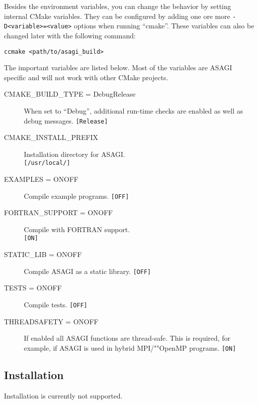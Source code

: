 Besides the environment variables, you can change the behavior by setting internal CMake variables. They can be configured by adding one ore more \texttt{-D<variable>=<value>} options when running ``cmake''. These variables can also be changed later with the following command:
\lstset{language=bash}
\begin{lstlisting}
ccmake <path/to/asagi_build>
\end{lstlisting}

The important variables are listed below. Most of the variables are ASAGI specific and will not work with other CMake projects.
\begin{description}
 \item[CMAKE\_BUILD\_TYPE = Debug\textbar Release] When set to ``Debug'', addi\-tion\-al run-time checks are enabled as well as debug messages. \texttt{[Release]}
 \item[CMAKE\_INSTALL\_PREFIX] Installation directory for ASAGI.\\ \texttt{[/usr/local/]}
 \item[EXAMPLES = ON\textbar OFF] Compile example programs. \texttt{[OFF]}
 \item[FORTRAN\_SUPPORT = ON\textbar OFF] Compile with FORTRAN support.\\ \texttt{[ON]}
 \item[STATIC\_LIB = ON\textbar OFF] Compile ASAGI as a static library. \texttt{[OFF]}
 \item[TESTS = ON\textbar OFF] Compile tests. \texttt{[OFF]}
 \item[THREADSAFETY = ON\textbar OFF] If enabled all ASAGI functions are thread-safe. This is required, for example, if ASAGI is used in hybrid MPI/""OpenMP programs. \texttt{[ON]}
\end{description}

\subsection{Installation}

Installation is currently not supported.